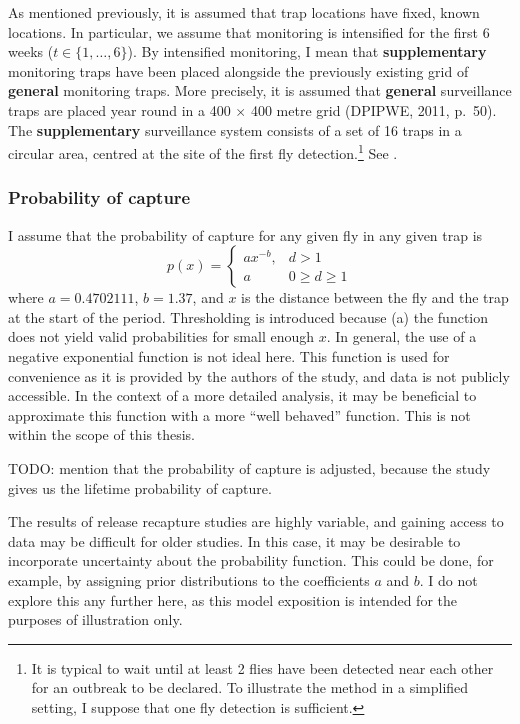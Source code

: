 \documentclass[
]{book}
\begin{document}
As mentioned previously, it is assumed that trap locations have fixed, known locations. In particular, we assume that monitoring is intensified for the first 6 weeks (\(t \in \{1, \ldots, 6\}\)). By intensified monitoring, I mean that \textbf{supplementary} monitoring traps have been placed alongside the previously existing grid of \textbf{general} monitoring traps. More precisely, it is assumed that \textbf{general} surveillance traps are placed year round in a 400 \(\times\) 400 metre grid (DPIPWE, 2011, p.~50). The \textbf{supplementary} surveillance system consists of a set of 16 traps in a circular area, centred at the site of the first fly detection.\footnote{It is typical to wait until at least 2 flies have been detected near each other for an outbreak to be declared. To illustrate the method in a simplified setting, I suppose that one fly detection is sufficient.} See \citet{trap_grid}.

\hypertarget{probability-of-capture}{%
\subsubsection{Probability of capture}\label{probability-of-capture}}

I assume that the probability of capture for any given fly in any given trap is
\[
p(x) = \begin{cases}ax^{-b}, & d>1 \\ a & 0 \geq d \geq 1\end{cases}
\]
where \(a = 0.4702111\), \(b = 1.37\), and \(x\) is the distance between the fly and the trap at the start of the period. Thresholding is introduced because (a) the function does not yield valid probabilities for small enough \(x\). In general, the use of a negative exponential function is not ideal here. This function is used for convenience as it is provided by the authors of the study, and data is not publicly accessible. In the context of a more detailed analysis, it may be beneficial to approximate this function with a more ``well behaved'' function. This is not within the scope of this thesis.

TODO: mention that the probability of capture is adjusted, because the study gives us the lifetime probability of capture.

The results of release recapture studies are highly variable, and gaining access to data may be difficult for older studies. In this case, it may be desirable to incorporate uncertainty about the probability function. This could be done, for example, by assigning prior distributions to the coefficients \(a\) and \(b\). I do not explore this any further here, as this model exposition is intended for the purposes of illustration only.
\end{document}
